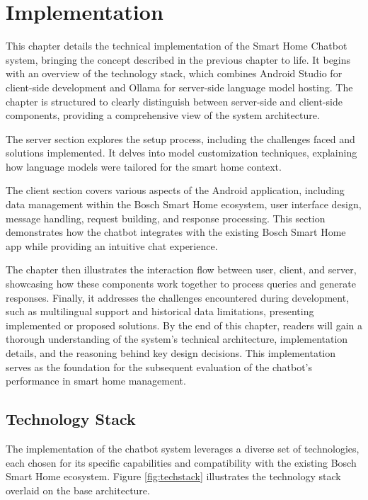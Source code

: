 \chapter{Implementation}
This chapter details the technical implementation of the Smart Home Chatbot system, bringing the concept described in the previous chapter to life. It begins with an overview of the technology stack, which combines Android Studio for client-side development and Ollama for server-side language model hosting. The chapter is structured to clearly distinguish between server-side and client-side components, providing a comprehensive view of the system architecture.

The server section explores the setup process, including the challenges faced and solutions implemented. It delves into model customization techniques, explaining how language models were tailored for the smart home context. 

The client section covers various aspects of the Android application, including data management within the Bosch Smart Home ecosystem, user interface design, message handling, request building, and response processing. This section demonstrates how the chatbot integrates with the existing Bosch Smart Home app while providing an intuitive chat experience.

The chapter then illustrates the interaction flow between user, client, and server, showcasing how these components work together to process queries and generate responses. Finally, it addresses the challenges encountered during development, such as multilingual support and historical data limitations, presenting implemented or proposed solutions.
By the end of this chapter, readers will gain a thorough understanding of the system's technical architecture, implementation details, and the reasoning behind key design decisions. This implementation serves as the foundation for the subsequent evaluation of the chatbot's performance in smart home management.

\label{chap:implementation}

\section{Technology Stack}
The implementation of the chatbot system leverages a diverse set of technologies, each chosen for its specific capabilities and compatibility with the existing Bosch Smart Home ecosystem. Figure \ref{fig:techstack} illustrates the technology stack overlaid on the base architecture.

